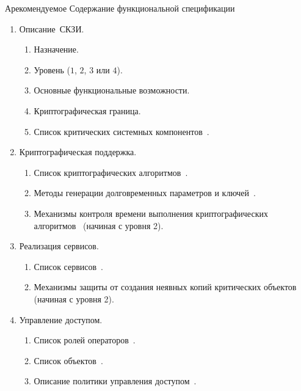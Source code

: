 \begin{appendix}{А}{рекомендуемое}
{Содержание функциональной спецификации}\label{SPEC}

\mbox{}

\begin{enumerate}
\item
{Описание~СКЗИ.}

\begin{enumerate}
\item
Назначение.
\item
Уровень ($1$, $2$, $3$ или $4$).
\item
Основные функциональные возможности.
\item
Криптографическая граница.
\item
Список критических системных компонентов~.
\end{enumerate}

\item
{Криптографическая поддержка.}

\begin{enumerate}
\item
Список криптографических алгоритмов~.

\item
Методы генерации долговременных параметров и ключей~.

\item
Механизмы контроля времени выполнения криптографических 
алгоритмов~ (начиная с уровня 2). 
\end{enumerate}

\item
{Реализация сервисов.}
\begin{enumerate}
\item
Список сервисов~.

\item
Механизмы защиты от создания неявных копий
критических объектов~ 
(начиная с уровня 2).
\end{enumerate}

\item
{Управление доступом.}

\begin{enumerate}
\item
Список ролей операторов~.

\item
Список объектов~.

\item
Описание политики управления доступом~.


\end{enumerate}
\end{enumerate}
\end{appendix}
